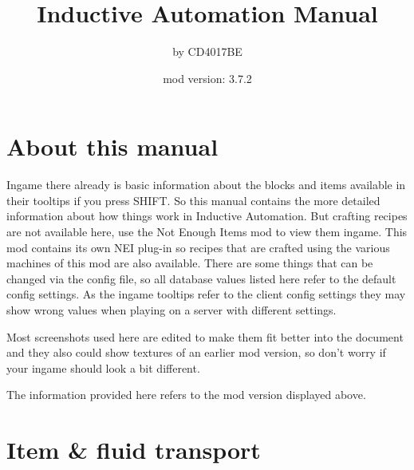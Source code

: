 \documentclass[11pt]{article} %
\title{Inductive Automation Manual}
\author{by CD4017BE}
\date{mod version: 3.7.2}
\begin{document}
 \maketitle
 \tableofcontents
 
 \section{About this manual}  
  Ingame there already is basic information about the blocks and items available in their tooltips if you press SHIFT. So this manual contains the more detailed information about how things work in Inductive Automation. But crafting recipes are not available here, use the Not Enough Items mod to view them ingame. This mod contains its own NEI plug-in so recipes that are crafted using the various machines of this mod are also available. There are some things that can be changed via the config file, so all database values listed here refer to the default config settings. As the ingame tooltips refer to the client config settings they may show wrong values when playing on a server with different settings.

Most screenshots used here are edited to make them fit better into the document and they also could show textures of an earlier mod version, so don't worry if your ingame should look a bit different. 

The information provided here refers to the mod version displayed above.

\newpage
\section{Item \& fluid transport}
\end{document}
